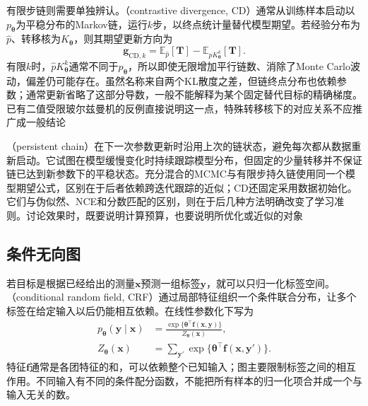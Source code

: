 有限步链则需要单独辨认。（contrastive divergence, CD）通常从训练样本启动以$p_{\bm{\theta}}$为平稳分布的Markov链，运行$k$步，以终点统计量替代模型期望。若经验分布为$\widehat p$、转移核为$K_{\bm{\theta}}$，则其期望更新方向为
\[
  \bm{g}_{\mathrm{CD},k}
    =\mathbb{E}_{\widehat p}[\bm{T}]
      -\mathbb{E}_{\widehat pK_{\bm{\theta}}^k}[\bm{T}].
\]
有限$k$时，$\widehat pK_{\bm{\theta}}^k$通常不同于$p_{\bm{\theta}}$，所以即使无限增加平行链数、消除了Monte Carlo波动，偏差仍可能存在。虽然名称来自两个KL散度之差，但链终点分布也依赖参数；通常更新省略了这部分导数，一般不能解释为某个固定替代目标的精确梯度。已有二值受限玻尔兹曼机的反例直接说明这一点，特殊转移核下的对应关系不应推广成一般结论

（persistent chain）在下一次参数更新时沿用上次的链状态，避免每次都从数据重新启动。它试图在模型缓慢变化时持续跟踪模型分布，但固定的少量转移并不保证链已达到新参数下的平稳状态。充分混合的MCMC与有限步持久链使用同一个模型期望公式，区别在于后者依赖跨迭代跟踪的近似；CD还固定采用数据初始化。它们与伪似然、NCE和分数匹配的区别，则在于后几种方法明确改变了学习准则。讨论效果时，既要说明计算预算，也要说明所优化或近似的对象

\subsection{条件无向图}
\label{sec:pgm-parameter-learning-conditional}

若目标是根据已经给出的测量$\bm{x}$预测一组标签$\bm{y}$，就可以只归一化标签空间。（conditional random field, CRF）通过局部特征组织一个条件联合分布，让多个标签在给定输入以后仍能相互依赖。在线性参数化下写为
\begin{equation}
  \begin{aligned}
    p_{\bm{\theta}}(\bm{y}\mid\bm{x})
      &=\frac{\exp\{\bm{\theta}^\top\bm{f}(\bm{x},\bm{y})\}}
              {Z_{\bm{\theta}}(\bm{x})},\\
    Z_{\bm{\theta}}(\bm{x})
      &=\sum_{\bm{y}'}
         \exp\{\bm{\theta}^\top\bm{f}(\bm{x},\bm{y}')\}.
  \end{aligned}
  \label{eq:pgm-parameter-learning-crf}
\end{equation}
特征$\bm{f}$通常是各团特征的和，可以依赖整个已知输入；图主要限制标签之间的相互作用。不同输入有不同的条件配分函数，不能把所有样本的归一化项合并成一个与输入无关的数。

